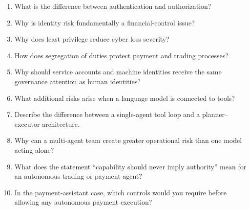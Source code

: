 \begin{enumerate}
    \item What is the difference between authentication and authorization?
    \item Why is identity risk fundamentally a financial-control issue?
    \item Why does least privilege reduce cyber loss severity?
    \item How does segregation of duties protect payment and trading processes?
    \item Why should service accounts and machine identities receive the same governance attention as human identities?
    \item What additional risks arise when a language model is connected to tools?
    \item Describe the difference between a single-agent tool loop and a planner--executor architecture.
    \item Why can a multi-agent team create greater operational risk than one model acting alone?
    \item What does the statement ``capability should never imply authority'' mean for an autonomous trading or payment agent?
    \item In the payment-assistant case, which controls would you require before allowing any autonomous payment execution?
\end{enumerate}
